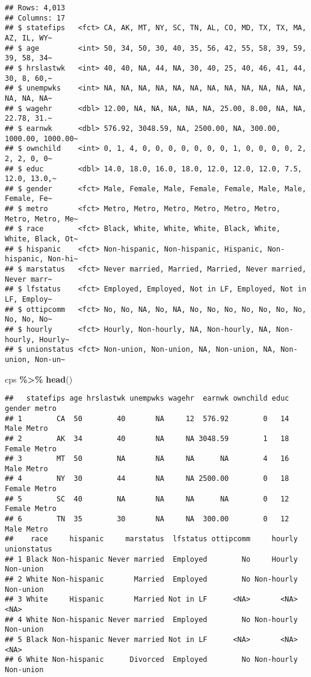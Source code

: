\documentclass[
]{article}
\newenvironment{Shaded}{\begin{snugshade}}{\end{snugshade}}
\newcommand{\FunctionTok}[1]{\textcolor[rgb]{0.13,0.29,0.53}{\textbf{#1}}}
\newcommand{\NormalTok}[1]{#1}
\newcommand{\SpecialCharTok}[1]{\textcolor[rgb]{0.81,0.36,0.00}{\textbf{#1}}}
\begin{document}
\begin{verbatim}
## Rows: 4,013
## Columns: 17
## $ statefips   <fct> CA, AK, MT, NY, SC, TN, AL, CO, MD, TX, TX, MA, AZ, IL, WY~
## $ age         <int> 50, 34, 50, 30, 40, 35, 56, 42, 55, 58, 39, 59, 39, 58, 34~
## $ hrslastwk   <int> 40, 40, NA, 44, NA, 30, 40, 25, 40, 46, 41, 44, 30, 8, 60,~
## $ unempwks    <int> NA, NA, NA, NA, NA, NA, NA, NA, NA, NA, NA, NA, NA, NA, NA~
## $ wagehr      <dbl> 12.00, NA, NA, NA, NA, NA, 25.00, 8.00, NA, NA, 22.78, 31.~
## $ earnwk      <dbl> 576.92, 3048.59, NA, 2500.00, NA, 300.00, 1000.00, 1000.00~
## $ ownchild    <int> 0, 1, 4, 0, 0, 0, 0, 0, 0, 0, 1, 0, 0, 0, 0, 2, 2, 2, 0, 0~
## $ educ        <dbl> 14.0, 18.0, 16.0, 18.0, 12.0, 12.0, 12.0, 7.5, 12.0, 13.0,~
## $ gender      <fct> Male, Female, Male, Female, Female, Male, Male, Female, Fe~
## $ metro       <fct> Metro, Metro, Metro, Metro, Metro, Metro, Metro, Metro, Me~
## $ race        <fct> Black, White, White, White, Black, White, White, Black, Ot~
## $ hispanic    <fct> Non-hispanic, Non-hispanic, Hispanic, Non-hispanic, Non-hi~
## $ marstatus   <fct> Never married, Married, Married, Never married, Never marr~
## $ lfstatus    <fct> Employed, Employed, Not in LF, Employed, Not in LF, Employ~
## $ ottipcomm   <fct> No, No, NA, No, NA, No, No, No, No, No, No, No, No, No, No~
## $ hourly      <fct> Hourly, Non-hourly, NA, Non-hourly, NA, Non-hourly, Hourly~
## $ unionstatus <fct> Non-union, Non-union, NA, Non-union, NA, Non-union, Non-un~
\end{verbatim}

\begin{Shaded}
\begin{Highlighting}[]
\NormalTok{cps }\SpecialCharTok{\%\textgreater{}\%} \FunctionTok{head}\NormalTok{()}
\end{Highlighting}
\end{Shaded}

\begin{verbatim}
##   statefips age hrslastwk unempwks wagehr  earnwk ownchild educ gender metro
## 1        CA  50        40       NA     12  576.92        0   14   Male Metro
## 2        AK  34        40       NA     NA 3048.59        1   18 Female Metro
## 3        MT  50        NA       NA     NA      NA        4   16   Male Metro
## 4        NY  30        44       NA     NA 2500.00        0   18 Female Metro
## 5        SC  40        NA       NA     NA      NA        0   12 Female Metro
## 6        TN  35        30       NA     NA  300.00        0   12   Male Metro
##    race     hispanic     marstatus  lfstatus ottipcomm     hourly unionstatus
## 1 Black Non-hispanic Never married  Employed        No     Hourly   Non-union
## 2 White Non-hispanic       Married  Employed        No Non-hourly   Non-union
## 3 White     Hispanic       Married Not in LF      <NA>       <NA>        <NA>
## 4 White Non-hispanic Never married  Employed        No Non-hourly   Non-union
## 5 Black Non-hispanic Never married Not in LF      <NA>       <NA>        <NA>
## 6 White Non-hispanic      Divorced  Employed        No Non-hourly   Non-union
\end{verbatim}
\end{document}
